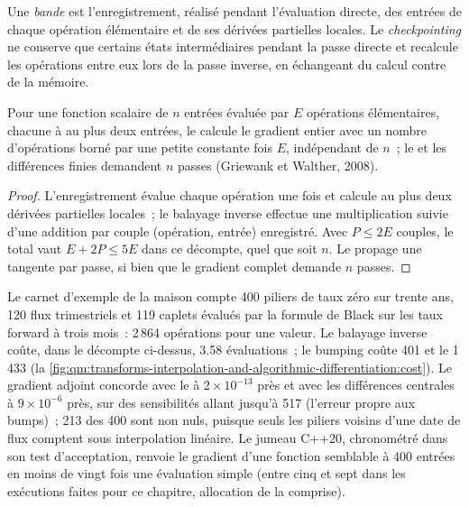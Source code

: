 \begin{definition}\label{def:qm:transforms-interpolation-and-algorithmic-differentiation:tape}
Une \emph{bande} est l'enregistrement, réalisé pendant l'évaluation directe, des entrées de chaque opération élémentaire et de ses dérivées partielles locales. Le \emph{checkpointing} ne conserve que certains
états intermédiaires pendant la passe directe et recalcule les opérations entre eux lors de la passe inverse, en échangeant du calcul contre de la mémoire.
\end{definition}

\begin{proposition}\label{prop:qm:transforms-interpolation-and-algorithmic-differentiation:cheap}
Pour une fonction scalaire de $n$ entrées évaluée par $E$ opérations élémentaires, chacune à au plus deux entrées, le  calcule le gradient entier avec un nombre d'opérations borné par une petite
constante fois $E$, indépendant de $n$~; le  et les différences finies demandent $n$ passes (Griewank et Walther, 2008).
\end{proposition}

\begin{proof}
L'enregistrement évalue chaque opération une fois et calcule au plus deux dérivées partielles locales~; le balayage inverse effectue une multiplication suivie d'une addition par couple (opération, entrée) enregistré. Avec $P \le 2E$ couples, le total
vaut $E + 2P \le 5E$ dans ce décompte, quel que soit $n$. Le  propage une tangente par passe, si bien que le gradient complet demande $n$ passes.
\end{proof}

Le carnet d'exemple de la maison compte 400 piliers de taux zéro sur trente ans, 120 flux trimestriels et 119 caplets évalués par la formule de Black sur les taux forward à trois mois~: 2\,864 opérations pour une valeur. Le balayage inverse
coûte, dans le décompte ci-dessus, 3.58 évaluations~; le bumping coûte 401 et le  1\,433 (la \cref{fig:qm:transforms-interpolation-and-algorithmic-differentiation:cost}). Le gradient adjoint concorde
avec le  à $2 \times 10^{-13}$ près et avec les différences centrales à $9 \times 10^{-6}$ près, sur des sensibilités allant jusqu'à 517 (l'erreur propre aux bumps)~; 213 des 400 sont non nuls, puisque seuls les piliers
voisins d'une date de flux comptent sous interpolation linéaire. Le jumeau C++20, chronométré dans son test d'acceptation, renvoie le gradient d'une fonction semblable à 400 entrées en moins de vingt fois une
évaluation simple (entre cinq et sept dans les exécutions faites pour ce chapitre, allocation de la  comprise).

